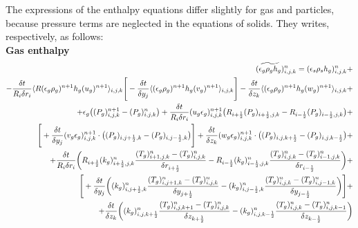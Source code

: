 The expressions of the enthalpy equations differ slightly for gas and particles,
because pressure terms are neglected in the equations of solids. They writes, respectively, as follows:\\

{\bf Gas enthalpy}\\
%
\begin{eqnarray}
\htmlimage{}
(\widetilde{\epsilon_g \rho_g h_g})^n_{i,j,k} = 
(\epsilon_s \rho_s h_g)_{i,j,k}^{n} +
\nonumber \\
- \frac {\delta t}{R_i \delta r_{i}} 
\langle R (\epsilon_g \rho_g)^{n+1} h_g (u_g)^{n+1} \rangle_{i,j,k}
\Bigg[
- \frac {\delta t}{\delta y_j} 
\langle (\epsilon_g \rho_g)^{n+1} h_g (v_g)^{n+1} \rangle_{i,j,k} 
\Bigg]
- \frac {\delta t}{\delta z_k} 
\langle (\epsilon_g \rho_g)^{n+1} h_g (w_g)^{n+1} \rangle_{i,j,k} + \nonumber \\
+ \epsilon_g \big ((P_g)_{i,j,k}^{n+1} - (P_g)_{i,j,k}^{n} \big )+
\frac {\delta t} {R_i \delta r_i} (u_g \epsilon_g)_{i,j,k}^{n+1}
\big( R_{i+\frac{1}{2}} (P_g)_{i+\frac{1}{2},j,k} - R_{i-\frac{1}{2}} (P_g)_{i-\frac{1}{2},j,k} \big) +
\nonumber \\
\Bigg[
+ \frac{\delta t}{\delta y_j} (v_g \epsilon_g)_{i,j,k}^{n+1}
\cdot \big( (P_g)_{i,j+\frac{1}{2},k} - (P_g)_{i,j-\frac{1}{2},k} \big)
\Bigg]
+ \frac{\delta t}{\delta z_k} (w_g \epsilon_g)_{i,j,k}^{n+1}
\cdot \big( (P_g)_{i,j,k+\frac{1}{2}} - (P_g)_{i,j,k-\frac{1}{2}} \big)+
\nonumber \\
+ \frac {\delta t} {R_i \delta r_i} \bigg( R_{i+\frac{1}{2}} 
(k_g)_{i+\frac{1}{2},j,k}^{n} 
\frac{(T_g)_{i+1,j,k}^{n} - (T_g)_{i,j,k}^{n}}{\delta r_{i+\frac{1}{2}}} 
- R_{i-\frac{1}{2}} (k_g)_{i-\frac{1}{2},j,k}^{n} 
\frac{(T_g)_{i,j,k}^{n} - (T_g)_{i-1,j,k}^{n}}{\delta r_{i-\frac{1}{2}}} \bigg)
+ \nonumber \\
\Bigg[
+ \frac {\delta t} {\delta y_j} \bigg( (k_g)_{i,j+\frac{1}{2},k}^{n} 
\frac{(T_g)_{i,j+1,k}^{n} - (T_g)_{i,j,k}^{n}}{\delta y_{j+\frac{1}{2}}} - 
(k_g)_{i,j-\frac{1}{2},k}^{n} \frac{(T_g)_{i,j,k}^{n} - 
(T_g)_{i,j-1,k}^{n}}{\delta y_{j-\frac{1}{2}}} \bigg)
\Bigg] +
\nonumber \\
+ \frac {\delta t} {\delta z_k} \bigg( (k_g)_{i,j,k+\frac{1}{2}}^{n} 
\frac{(T_g)_{i,j,k+1}^{n} - (T_g)_{i,j,k}^{n}}{\delta z_{k+\frac{1}{2}}} - 
(k_g)_{i,j,k-\frac{1}{2}}^{n} \frac{(T_g)_{i,j,k}^{n} - 
(T_g)_{i,j,k-1}^{n}}{\delta z_{k-\frac{1}{2}}} \bigg)
\nonumber
\end{eqnarray}


